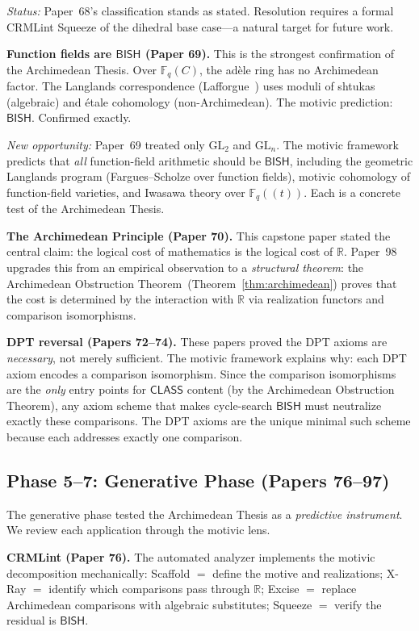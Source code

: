 \documentclass[11pt,a4paper]{article}
\theoremstyle{plain}
\theoremstyle{definition}
\newcommand{\BISH}{\textsf{BISH}}
\newcommand{\CLASS}{\textsf{CLASS}}
\newcommand{\R}{\mathbb{R}}
\newcommand{\F}{\mathbb{F}}
\newcommand{\GL}{\mathrm{GL}}
\begin{document}
\emph{Status:} Paper~68's classification stands as stated. Resolution requires a formal CRMLint Squeeze of the dihedral base case---a natural target for future work.

\medskip
\noindent\textbf{Function fields are $\BISH$ (Paper 69).} This is the strongest confirmation of the Archimedean Thesis. Over $\F_q(C)$, the ad\`ele ring has no Archimedean factor. The Langlands correspondence (Lafforgue~\cite{lafforgue02}) uses moduli of shtukas (algebraic) and \'etale cohomology (non-Archimedean). The motivic prediction: $\BISH$. Confirmed exactly.

\emph{New opportunity:} Paper~69 treated only $\GL_2$ and $\GL_n$. The motivic framework predicts that \emph{all} function-field arithmetic should be $\BISH$, including the geometric Langlands program (Fargues--Scholze over function fields), motivic cohomology of function-field varieties, and Iwasawa theory over $\F_q(\!(t)\!)$. Each is a concrete test of the Archimedean Thesis.

\medskip
\noindent\textbf{The Archimedean Principle (Paper 70).} This capstone paper stated the central claim: the logical cost of mathematics is the logical cost of $\R$. Paper~98 upgrades this from an empirical observation to a \emph{structural theorem}: the Archimedean Obstruction Theorem~(Theorem~\ref{thm:archimedean}) proves that the cost is determined by the interaction with $\R$ via realization functors and comparison isomorphisms.

\medskip
\noindent\textbf{DPT reversal (Papers 72--74).} These papers proved the DPT axioms are \emph{necessary}, not merely sufficient. The motivic framework explains why: each DPT axiom encodes a comparison isomorphism. Since the comparison isomorphisms are the \emph{only} entry points for $\CLASS$ content (by the Archimedean Obstruction Theorem), any axiom scheme that makes cycle-search $\BISH$ must neutralize exactly these comparisons. The DPT axioms are the unique minimal such scheme because each addresses exactly one comparison.

\subsection{Phase 5--7: Generative Phase (Papers 76--97)}\label{app:generative}

The generative phase tested the Archimedean Thesis as a \emph{predictive instrument}. We review each application through the motivic lens.

\medskip
\noindent\textbf{CRMLint (Paper 76).} The automated analyzer implements the motivic decomposition mechanically: Scaffold $=$ define the motive and realizations; X-Ray $=$ identify which comparisons pass through $\R$; Excise $=$ replace Archimedean comparisons with algebraic substitutes; Squeeze $=$ verify the residual is $\BISH$.
\end{document}
